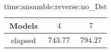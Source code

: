 \begin{table}[!ht]
	\centering
	\begin{tabular}{|c|c|c|}
		\hline
		Models & $4$ & $7$ \\ \hline
		elapsed & $743.77$ & $794.27$ \\ \hline
	\end{tabular}
	\caption{time:ansamble:reverse:no_Dst}
	\label{tab:time:ansamble:reverse:no_Dst}
\end{table}

